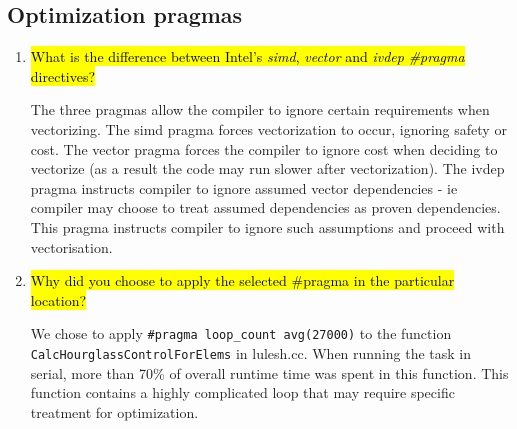 \documentclass{article}
\begin{document}
\subsection{Optimization pragmas}
\begin{enumerate}
	\item \hl{What is the difference between Intel's \emph{simd}, \emph{vector} and \emph{ivdep} \emph{\#pragma} directives?}

	The three pragmas allow the compiler to ignore certain requirements when vectorizing. The simd pragma forces vectorization to occur, ignoring safety or cost. The vector pragma forces the compiler to ignore cost when deciding to vectorize (as a result the code may run slower after vectorization). The ivdep pragma instructs compiler to ignore assumed vector dependencies - ie compiler may choose to treat assumed dependencies as proven dependencies. This pragma instructs compiler to ignore such assumptions and proceed with vectorisation.
	\item \hl{Why did you choose to apply the selected \#pragma in the particular location?}

	We chose to apply \verb!#pragma loop_count avg(27000)! to the function \verb!CalcHourglassControlForElems! in lulesh.cc. When running the task in serial, more than 70\% of overall runtime time was spent in this function. This function contains a highly complicated loop that may require specific treatment for optimization.
\end{enumerate}
\end{document}
